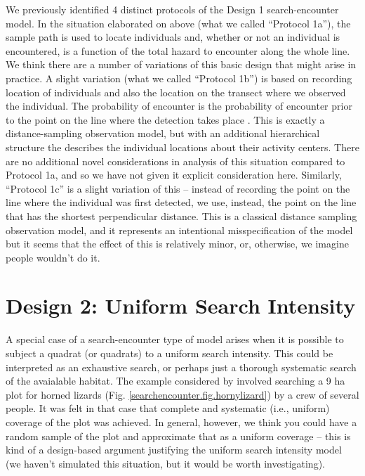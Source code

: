 We previously identified 4 distinct protocols of the Design 1
search-encounter model.
In the situation elaborated on above (what we called ``Protocol 1a''), the sample path is used to
locate individuals and, whether or not an individual is encountered,
is a function of the total hazard to encounter along the whole line.
We think there are a number of variations of this basic design that
might arise in practice.
A slight variation (what we called ``Protocol 1b'') is based on
recording location of individuals and also the location on the transect
where we observed the individual.  The probability of encounter is the
probability of encounter prior to the point on the line where the
detection takes place
\citep{skaug_schweder:1999}.
This is exactly a distance-sampling observation model, but with an
additional hierarchical structure the describes the individual
locations about their activity centers. There are no additional novel
considerations in analysis of this situation compared to Protocol 1a,
and so we have not given it explicit consideration here. Similarly,
``Protocol 1c'' is a slight variation of this -- instead of recording
the point on the line where the individual was first detected, we use,
instead, the point on the line that has the shortest perpendicular
distance. This is a classical distance sampling observation model, and
it represents an intentional misspecification of the model but it
seems that the effect of this is relatively minor, or, otherwise, we
imagine people wouldn't do it.

\section{Design 2: Uniform Search Intensity}

A special case of a search-encounter type of model arises when it is
possible to subject a quadrat (or quadrats) to a uniform search
intensity. This could be interpreted as an exhaustive search, or
perhaps just a thorough systematic search of the avaialable habitat.
The example considered by \citet{royle_young:2008} involved searching
 a 9 ha plot for horned lizards (Fig.
\ref{searchencounter.fig.hornylizard}) by a crew of several people. It
was felt in that case that complete and systematic (i.e., uniform) coverage of the plot was
achieved. In general, however, we think you could have a random sample
of the plot and approximate that as a uniform coverage -- this is kind
of a design-based argument justifying the uniform search intensity
model (we haven't simulated this situation, but it would be worth
investigating).


